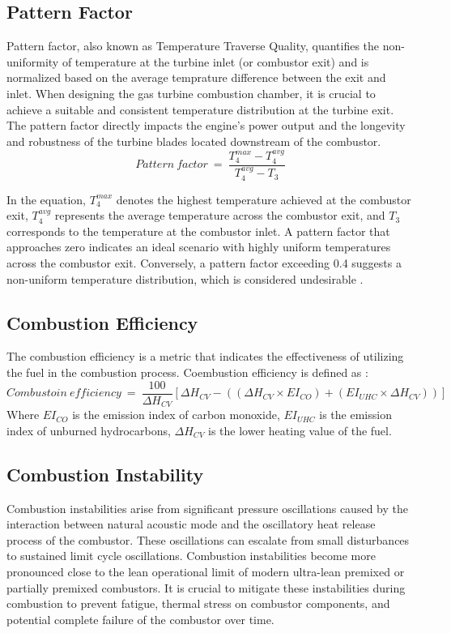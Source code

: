 \subsection{Pattern Factor}
Pattern factor, also known as Temperature Traverse Quality, quantifies the non-uniformity of temperature at the turbine inlet (or combustor exit) and is normalized based on the average temprature difference between the exit and inlet. When designing the gas turbine combustion chamber, it is crucial to achieve a suitable and consistent temperature distribution at the turbine exit. The pattern factor directly impacts the engine's power output and the longevity and robustness of the turbine blades located downstream of the combustor.
\begin{equation}
    Pattern\ factor\ = \ \frac{T^{max}_4 - T^{avg}_4}{T^{avg}_4 - T_3}
\end{equation}

In the equation, $T^{max}_4$ denotes the highest temperature achieved at the combustor exit, $T^{avg}_4$ represents the average temperature across the combustor exit, and $T_3$ corresponds to the temperature at the combustor inlet. A pattern factor that approaches zero indicates an ideal scenario with highly uniform temperatures across the combustor exit. Conversely, a pattern factor exceeding 0.4 suggests a non-uniform temperature distribution, which is considered undesirable \cite{mattingly2005elements}.

\subsection{Combustion Efficiency}
The combustion efficiency is a metric that indicates the effectiveness of utilizing the fuel in the combustion process. Coembustion efficiency is defined as \cite{GTT1996}:
\begin{equation}
    Combustoin\ efficiency\ = \ \frac{100}{\Delta H_{CV}}[\Delta H_{CV} - ((\Delta H_{CV} \times EI_{CO}) + (EI_{UHC}\times\Delta H_{CV}))]
\end{equation}
Where $EI_{CO}$ is the emission index of carbon monoxide, $EI_{UHC}$ is the emission index of unburned hydrocarbons, $\Delta H_{CV}$ is the lower heating value of the fuel.

\subsection{Combustion Instability}
Combustion instabilities arise from significant pressure oscillations caused by the interaction between natural acoustic mode and the oscillatory heat release process of the combustor. These oscillations can escalate from small disturbances to sustained limit cycle oscillations. Combustion instabilities become more pronounced close to the lean operational limit of modern ultra-lean premixed or partially premixed combustors. It is crucial to mitigate these instabilities during combustion to prevent fatigue, thermal stress on combustor components, and potential complete failure of the combustor over time.

